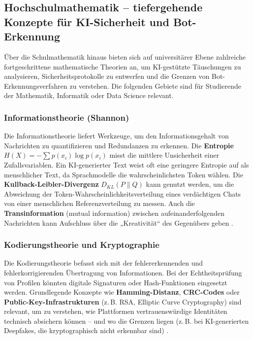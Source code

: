 \documentclass[12pt,a4paper,oneside]{scrartcl}
\begin{document}
	\subsection{Hochschulmathematik – tiefergehende Konzepte für KI-Sicherheit und Bot-Erkennung}
	
	Über die Schulmathematik hinaus bieten sich auf universitärer Ebene zahlreiche fortgeschrittene mathematische Theorien an, um KI-gestützte Täuschungen zu analysieren, Sicherheitsprotokolle zu entwerfen und die Grenzen von Bot-Erkennungsverfahren zu verstehen. Die folgenden Gebiete sind für Studierende der Mathematik, Informatik oder Data Science relevant.
	
	\subsubsection{Informationstheorie (Shannon)}
	Die Informationstheorie liefert Werkzeuge, um den Informationsgehalt von Nachrichten zu quantifizieren und Redundanzen zu erkennen. Die \textbf{Entropie} $H(X) = -\sum p(x_i) \log p(x_i)$ misst die mittlere Unsicherheit einer Zufallsvariablen. Ein KI-generierter Text weist oft eine geringere Entropie auf als menschlicher Text, da Sprachmodelle die wahrscheinlichsten Token wählen. Die \textbf{Kullback-Leibler-Divergenz} $D_{KL}(P \| Q)$ kann genutzt werden, um die Abweichung der Token-Wahrscheinlichkeitsverteilung eines verdächtigen Chats von einer menschlichen Referenzverteilung zu messen. Auch die \textbf{Transinformation} (mutual information) zwischen aufeinanderfolgenden Nachrichten kann Aufschluss über die „Kreativität“ des Gegenübers geben \cite{CoverThomas2006}.
	
	\subsubsection{Kodierungstheorie und Kryptographie}
	Die Kodierungstheorie befasst sich mit der fehlererkennenden und fehlerkorrigierenden Übertragung von Informationen. Bei der Echtheitsprüfung von Profilen könnten digitale Signaturen oder Hash-Funktionen eingesetzt werden. Grundlegende Konzepte wie \textbf{Hamming-Distanz}, \textbf{CRC-Codes} oder \textbf{Public-Key-Infrastrukturen} (z.\,B. RSA, Elliptic Curve Cryptography) sind relevant, um zu verstehen, wie Plattformen vertrauenswürdige Identitäten technisch absichern können – und wo die Grenzen liegen (z.\,B. bei KI-generierten Deepfakes, die kryptographisch nicht erkennbar sind) \cite{Stinson2006}.
	
\end{document}
